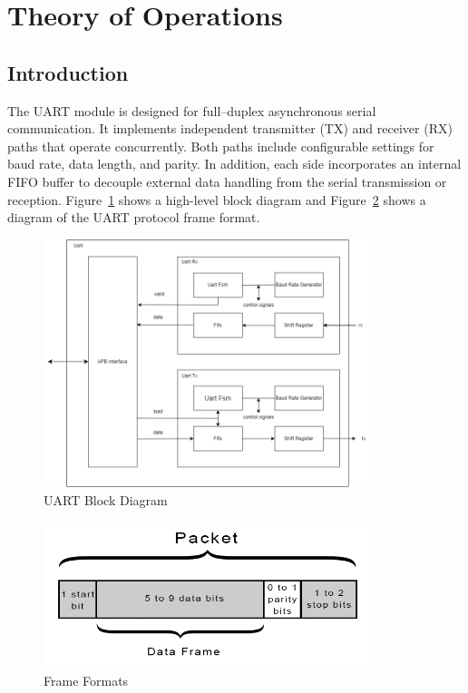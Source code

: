 \section{Theory of Operations}

\subsection{Introduction}
The UART module is designed for full–duplex asynchronous serial communication.
It implements independent transmitter (TX) and receiver (RX) paths that operate concurrently.
Both paths include configurable settings for baud rate, data length, and parity.
In addition, each side incorporates an internal FIFO buffer to decouple external data handling
from the serial transmission or reception. Figure~\ref{fig:uart_blockdiagram}
shows a high-level block diagram and Figure~\ref{fig:frame_formats} shows a diagram of the UART protocol frame format.

\begin{figure}[H]
  \centering
  \includegraphics[width=0.85\textwidth]{images/uart_block_diagram.png}
  \caption{UART Block Diagram}
  \label{fig:uart_blockdiagram}
\end{figure}

\begin{figure}[H]
    \centering
    \includegraphics[width=0.85\textwidth]{images/frame_format.png}
    \caption{Frame Formats}
    \label{fig:frame_formats}
\end{figure}


